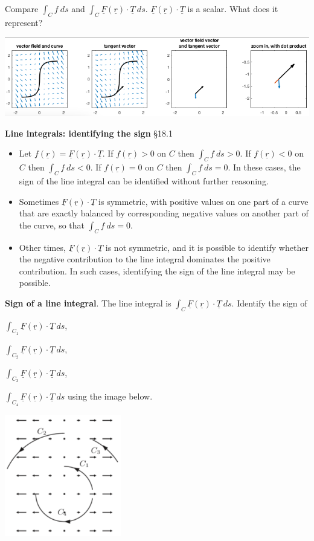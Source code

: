 \documentclass[12pt,letterpaper,noanswers]{exam}
\newcommand{\mb}[1]{\underline{#1}}
\begin{document}
Compare $\int_C f\ ds$ and $\int_C \mb F(\mb r)\cdot \mb T\ ds$.  $\mb F(\mb r)\cdot \mb T$ is a scalar.  What does it represent?

\hspace{-0.3in}\includegraphics[width=0.8\linewidth]{img/C25p3-18.png}

\vspace{1in}


\noindent\textbf{Line integrals: identifying the sign} \S 18.1
\begin{tcolorbox}
\begin{itemize}
\itemsep0em
    \item Let $f(\mb r) = \mb F(\mb r)\cdot \mb T$.  If $f(\mb r)>0$ on $C$ then $\int_C f\ ds>0$.  If $f(\mb r)<0$ on $C$ then $\int_C f\ ds < 0$.  If $f(\mb r) = 0$ on $C$ then $\int_C f\ ds = 0$.  In these cases, the sign of the line integral can be identified without further reasoning.
    \item Sometimes $\mb F(\mb r)\cdot \mb T$ is symmetric, with positive values on one part of a curve that are exactly balanced by corresponding negative values on another part of the curve, so that $\int_C f\ ds = 0$.
    \item Other times, $\mb F(\mb r)\cdot \mb T$ is not symmetric, and it is possible to identify whether the negative contribution to the line integral dominates the positive contribution.  In such cases, identifying the sign of the line integral may be possible.
\end{itemize}
\end{tcolorbox}

\noindent\textbf{Sign of a line integral}.
The line integral is $\displaystyle\int_C \mb F(\mb r)\cdot \mb T\ ds$.  Identify the sign of 

$\displaystyle\int_{C_1} \mb F(\mb r)\cdot \mb T\ ds$,

$\displaystyle\int_{C_2} \mb F(\mb r)\cdot \mb T\ ds$,

$\displaystyle\int_{C_3} \mb F(\mb r)\cdot \mb T\ ds$,

$\displaystyle\int_{C_4} \mb F(\mb r)\cdot \mb T\ ds$ using the image below.


\includegraphics[width=2in]{img/C25p2-18.png}
\end{document}
